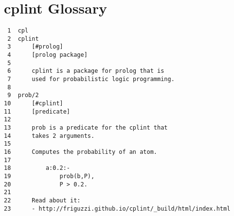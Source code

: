 \documentclass[11pt]{article}
\begin{document}
\section{cplint Glossary}
\label{sec:orgb241378}

\begin{verbatim}
 1  cpl
 2  cplint
 3      [#prolog]
 4      [prolog package]
 5  
 6      cplint is a package for prolog that is
 7      used for probabilistic logic programming.
 8  
 9  prob/2
10      [#cplint]
11      [predicate]
12  
13      prob is a predicate for the cplint that
14      takes 2 arguments.
15  
16      Computes the probability of an atom.
17  
18          a:0.2:-
19              prob(b,P),
20              P > 0.2.
21  
22      Read about it:
23      - http://friguzzi.github.io/cplint/_build/html/index.html
\end{verbatim}
\end{document}
